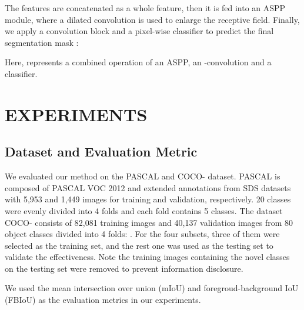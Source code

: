 \documentclass[conference]{IEEEtran}
\begin{document}
The features  are concatenated as a whole feature, then it is fed into an ASPP module, where a dilated convolution is used to enlarge the receptive field. Finally, we apply a convolution block and a pixel-wise classifier to predict the final segmentation mask :


Here,  represents a combined operation of an ASPP, an -convolution and a classifier. 

\section{EXPERIMENTS}

\subsection{Dataset and Evaluation Metric}

We evaluated our method on the PASCAL  \cite{RN4} and COCO- \cite{COCO} dataset. PASCAL  is composed of PASCAL VOC 2012 and extended annotations from SDS \cite{SDS} datasets with 5,953 and 1,449 images for training and validation, respectively. 20 classes were evenly divided into 4 folds  and each fold contains 5 classes. The dataset COCO- consists of 82,081 training images and 40,137 validation images from 80 object classes divided into 4 folds: . For the four subsets, three of them were selected as the training set, and the rest one was used as the testing set to validate the effectiveness. Note the training images containing the novel classes on the testing set were removed to prevent information disclosure.

We used the mean intersection over union (mIoU) and foregroud-background IoU (FBIoU) as the evaluation metrics in our experiments.
\end{document}
